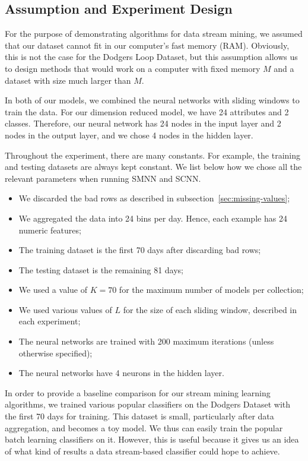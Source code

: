 \documentclass[conference]{IEEEtran}
\begin{document}
		\subsection{Assumption and Experiment Design}
		For the purpose of demonstrating algorithms for data stream mining, we assumed that our dataset cannot fit in our computer's fast memory (RAM). Obviously, this is not the case for the Dodgers Loop Dataset, but this assumption allows us to design methods that would work on a computer with fixed memory $M$ and a dataset with size much larger than $M$.
		
		In both of our models, we combined the neural networks with sliding windows to train the data. For our dimension reduced model, we have 24 attributes and 2 classes. Therefore, our neural network has 24 nodes in the input layer and 2 nodes in the output layer, and we chose 4 nodes in the hidden layer. 
		
		Throughout the experiment, there are many constants. For example, the training and testing datasets are always kept constant. We list below how we chose all the relevant parameters when running SMNN and SCNN. 
		\begin{itemize}
			\item We discarded the bad rows as described in subsection~\ref{sec:missing-values};
			\item We aggregated the data into 24 bins per day. Hence, each example has 24 numeric features;
			\item The training dataset is the first 70 days after discarding bad rows;
			\item The testing dataset is the remaining 81 days;
			\item We used a value of $K=70$ for the maximum number of models per collection;
			\item We used various values of $L$ for the size of each sliding window, described in each experiment;
			\item The neural networks are trained with 200 maximum iterations (unless otherwise specified);
			\item The neural networks have 4 neurons in the hidden layer.
		\end{itemize}
		
		In order to provide a baseline comparison for our stream mining learning algorithms, we trained various popular classifiers on the Dodgers Dataset with the first 70 days for training. This dataset is small, particularly after data aggregation, and becomes a toy model. We thus can easily train the popular batch learning classifiers on it. However, this is useful because it gives us an idea of what kind of results a data stream-based classifier could hope to achieve.
		
\end{document}
